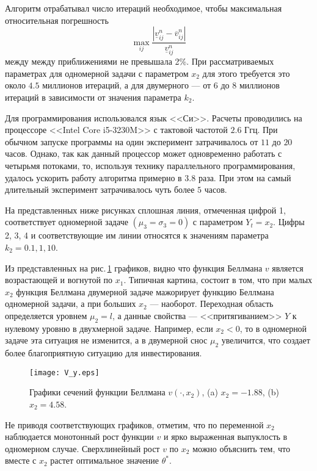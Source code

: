 Алгоритм отрабатывал число итераций необходимое, чтобы максимальная относительная погрешность
$$ \max_{ij}\frac{|\underline v^n_{ij}-\overline v^n_{ij}|}{\underline v^n_{ij}}$$
между между приближениями не превышала  2\%.
При рассматриваемых параметрах для одномерной задачи с параметром $x_2$ для этого требуется это около $4.5$ миллионов итераций, а для двумерного --- от 6 до 8 миллионов итераций в зависимости от значения параметра $k_2$.

Для программирования использовался язык <<Си>>. Расчеты проводились на процессоре <<Intel Core i5-3230M>> с тактовой частотой $2.6$ Ггц. При обычном запуске программы на один эксперимент затрачивалось от $11$ до $20$ часов. Однако, так как данный процессор может одновременно работать с четырьмя потоками, то, используя технику параллельного программирования, удалось ускорить работу алгоритма примерно в $3.8$ раза. При этом на самый длительный эксперимент затрачивалось чуть более $5$ часов.

На представленных ниже рисунках сплошная линия, отмеченная цифрой 1, соответствует одномерной задаче $(\mu_3=\sigma_3=0)$  с параметром $Y_t=x_2$. Цифры 2, 3, 4 и соответствующие им линии относятся к значениям параметра $k_2=0.1 , 1, 10$.

Из представленных на рис.\,\ref{fig:1.1} графиков, видно что функция Беллмана $v$ является возрастающей и вогнутой по $x_1$. Типичная картина, состоит в том, что при малых $x_2$ функция Беллмана двумерной задаче мажорирует функцию Беллмана одномерной задачи, а при больших $x_2$ --- наоборот. Переходная область определяется уровнем $\mu_2=l$, а данные свойства --- <<притягиванием>> $Y$ к нулевому уровню в двухмерной задаче. Например, если $x_2<0$, то в одномерной задаче эта ситуация не изменится, а в двумерной снос $\mu_2$ увеличится, что создает более благоприятную ситуацию для инвестирования.

\begin{figure}[h]
        \centering
          \texttt{[image: V\_y.eps]}
         \caption{Графики сечений функции Беллмана $v(\cdot,x_2)$, (a) $x_2=-1.88$, (b) $x_2=4.58$.}
          \label{fig:1.1}
\end{figure}

Не приводя соответствующих графиков, отметим, что по переменной $x_2$ наблюдается монотонный рост функции $v$ и ярко выраженная выпуклость в одномерном случае. Сверхлинейный рост $v$ по $x_2$ можно объяснить тем, что вместе с $x_2$ растет оптимальное значение $\theta^*$.

